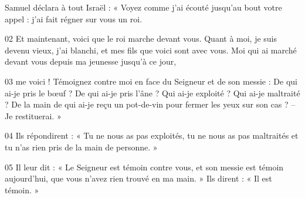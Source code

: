 Samuel déclara à tout Israël : « Voyez comme j’ai écouté jusqu’au bout votre appel : j’ai fait régner sur vous un roi.

02 Et maintenant, voici que le roi marche devant vous. Quant à moi, je suis devenu vieux, j’ai blanchi, et mes fils que voici sont avec vous. Moi qui ai marché devant vous depuis ma jeunesse jusqu’à ce jour,

03 me voici ! Témoignez contre moi en face du Seigneur et de son messie : De qui ai-je pris le bœuf ? De qui ai-je pris l’âne ? Qui ai-je exploité ? Qui ai-je maltraité ? De la main de qui ai-je reçu un pot-de-vin pour fermer les yeux sur son cas ? – Je restituerai. »

04 Ils répondirent : « Tu ne nous as pas exploités, tu ne nous as pas maltraités et tu n’as rien pris de la main de personne. »

05 Il leur dit : « Le Seigneur est témoin contre vous, et son messie est témoin aujourd’hui, que vous n’avez rien trouvé en ma main. » Ils dirent : « Il est témoin. »
